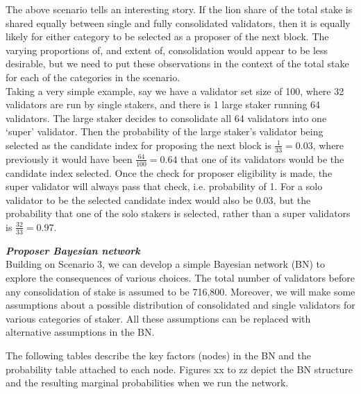 The above scenario tells an interesting story. If the lion share of the total stake is shared equally between single and fully consolidated validators, then it is equally likely for either category to be selected as a proposer of the next block. The varying proportions of, and extent of, consolidation would appear to be less desirable, but we need to put these observations in the context of the total stake for each of the categories in the scenario. \\

Taking a very simple example, say we have a validator set size of 100, where 32 validators are run by single stakers, and there is 1 large staker running 64 validators. The large staker decides to consolidate all 64 validators into one `super' validator. Then the probability of the large staker's validator being selected as the candidate index for proposing the next block is $\frac{1}{33} = 0.03$, where previously it would have been $\frac{64}{100} = 0.64$ that one of its validators would be the candidate index selected. Once the check for proposer eligibility is made, the super validator will always pass that check, i.e. probability of 1. For a solo validator to be the selected candidate index would also be 0.03, but the probability that one of the solo stakers is selected, rather than a super validators is $\frac{32}{33} = 0.97$.

\noindent
\clearpage

\textbf{\textit{Proposer Bayesian network}} \\
\noindent
Building on Scenario 3, we can develop a simple Bayesian network (BN)  to explore the consequences of various choices. The total number of validators before any consolidation of stake is assumed to be 716,800.  Moreover, we will make some assumptions about a possible distribution of consolidated and single validators for various categories of staker. All these assumptions can be replaced with alternative assumptions in the BN. 

The following tables describe the key factors (nodes) in the BN and the probability table attached to each node. Figures xx to zz depict the BN structure and the resulting marginal probabilities when we run the network.
 
